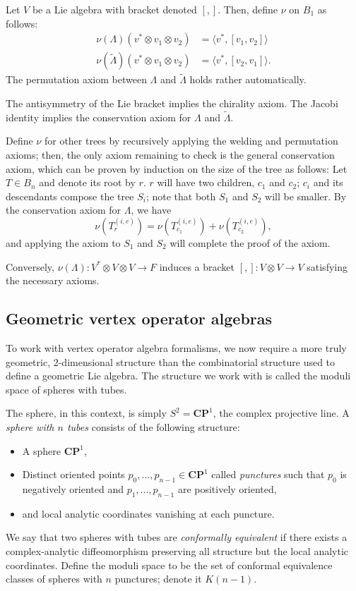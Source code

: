 \documentclass{article}
\newcommand{\CP}{\mathbold{CP}}
\begin{document}
Let $V$ be a Lie algebra with bracket denoted $[,]$.  Then, define $\nu$ on $B_1$ as follows:
\begin{align}
  \nu(\Lambda)(v^* \otimes v_1 \otimes v_2)&=\langle v^*,[v_1,v_2] \rangle\\
  \nu(\widetilde{\Lambda})(v^* \otimes v_1 \otimes v_2)&=\langle v^*,[v_2,v_1] \rangle.
\end{align}
The permutation axiom between $\Lambda$ and $\widetilde{\Lambda}$ holds rather automatically.

The antisymmetry of the Lie bracket implies the chirality axiom.  The Jacobi identity implies the conservation axiom for $\Lambda$ and $\widetilde{\Lambda}$.

Define $\nu$ for other trees by recursively applying the welding and permutation axioms; then, the only axiom remaining to check is the general conservation axiom, which can be proven by induction on the size of the tree as follows: Let $T \in B_n$ and denote its root by $r$.  $r$ will have two children, $c_1$ and $c_2$; $c_i$ and its descendants compose the tree $S_i$; note that both $S_1$ and $S_2$ will be smaller.  By the conservation axiom for $\Lambda$, we have
\[\nu(T^{(i,e)}_r)=\nu(T^{(i,e)}_{c_1})+\nu(T^{(i,e)}_{c_2}), \]
and applying the axiom to $S_1$ and $S_2$ will complete the proof of the axiom.

Conversely, $\nu(\Lambda):V^* \otimes V \otimes V \rightarrow F$ induces a bracket $[,]: V \otimes V \rightarrow V$ satisfying the necessary axioms.
\subsection{Geometric vertex operator algebras}
\label{sec:geomvoa}
To work with vertex operator algebra formalisms, we now require a more truly geometric, $2$-dimensional structure than the combinatorial structure used to define a geometric Lie algebra.  The structure we work with is called the moduli space of spheres with tubes.

The sphere, in this context, is simply $S^2=\CP^1$, the complex projective line.  A \textit{sphere with $n$ tubes} consists of the following structure:
\begin{itemize}
\item A sphere $\CP^1$,
\item Distinct oriented points $p_0,...,p_{n-1} \in \CP^1$ called \textit{punctures} such that $p_0$ is negatively oriented and $p_1,...,p_{n-1}$ are positively oriented,
\item and local analytic coordinates vanishing at each puncture.
\end{itemize}
We say that two spheres with tubes are \textit{conformally equivalent} if there exists a complex-analytic diffeomorphism preserving all structure but the local analytic coordinates.  Define the moduli space to be the set of conformal equivalence classes of spheres with $n$ punctures; denote it $K(n-1)$.
\end{document}
